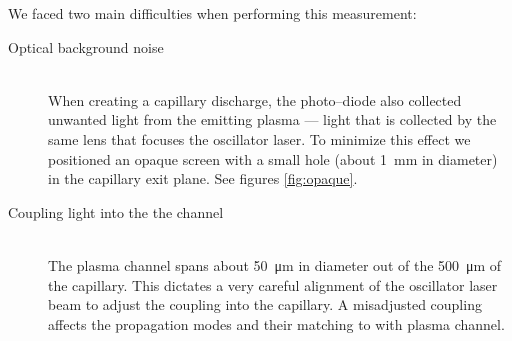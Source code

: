 \documentclass[../main.tex]{subfiles}
\begin{document}
We faced two main difficulties when performing this measurement:
\begin{description}
  \item[\textnormal{Optical background noise}] \hfill \\ When creating a capillary discharge, the photo--diode also collected unwanted light from the emitting plasma --- light that is collected by the same lens that focuses the oscillator laser. To minimize this effect we positioned an opaque screen with a small hole (about \SI{1}{\mm} in diameter) in the capillary exit plane. See figures \ref{fig:opaque}.
  \item[\textnormal{Coupling light into the the channel}] \hfill \\ The plasma channel spans about \SI{50}{\um} in diameter out of the \SI{500}{\um} of the capillary. This dictates a very careful alignment of the oscillator laser beam to adjust the coupling into the capillary. A misadjusted coupling affects the propagation modes and their matching to with plasma channel.
\end{description}
\end{document}
